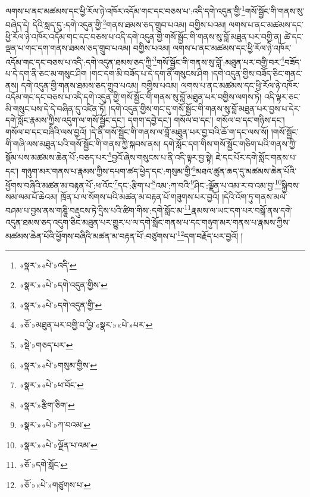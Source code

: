 ལགས་པ་ནང་མཚམས་དང་ཕྱི་རོལ་ཉེ་འཁོར་འདོམ་གང་དང་བཅས་པ་:འདི་དགེ་འདུན་གྱི་\footnote{«སྣར་»«པེ་»འདི་}གསོ་སྦྱོང་གི་གནས་སུ་བཞེད་དེ། དེའི་སླད་དུ་:དགེ་འདུན་གྱི་\footnote{«སྣར་»«པེ་»དགེ་འདུན་གྱིས་}གནས་ཐམས་ཅད་གྲུབ་པའམ། བགྱིས་པའམ། ལགས་པ་ནང་མཚམས་དང་ཕྱི་རོལ་ཉེ་འཁོར་འདོམ་གང་དང་བཅས་པ་འདི་དགེ་འདུན་གྱི་གསོ་སྦྱོང་གི་གནས་སུ་བློ་མཐུན་པར་བགྱི་ན། ཚེ་དང་ལྡན་པ་གང་དག་གནས་ཐམས་ཅད་གྲུབ་པའམ། བགྱིས་པའམ། ལགས་པ་ནང་མཚམས་དང་ཕྱི་རོལ་ཉེ་འཁོར་འདོམ་གང་དང་བཅས་པ་འདི་:དགེ་འདུན་ཐམས་ཅད་ཀྱི་\footnote{«སྣར་»«པེ་»དགེ་འདུན་གྱི་}གསོ་སྦྱོང་གི་གནས་སུ་བློ་:མཐུན་པར་བགྱི་བར་\footnote{«ཅོ་»མཐུན་པར་བགྱི་བ་ྱི་བ་«སྣར་»«པེ་»པར་}བཟོད་པ་དེ་དག་ནི་ཅང་མ་གསུང་ཤིག །གང་དག་མི་བཟོད་པ་དེ་དག་ནི་གསུངས་ཤིག །དགེ་འདུན་གྱིས་བཟོད་ཅིང་གནང་ནས། དགེ་འདུན་གྱི་གནས་ཐམས་ཅད་གྲུབ་པའམ། བགྱིས་པའམ། ལགས་པ་ནང་མཚམས་དང་ཕྱི་རོལ་ཉེ་འཁོར་འདོམ་གང་དང་བཅས་པ་འདི་དགེ་འདུན་གྱི་གསོ་སྦྱོང་གི་གནས་སུ་བློ་མཐུན་པར་བགྱིས་ལགས་ཏེ། འདི་ལྟར་ཅང་མི་གསུང་པས་དེ་དེ་བཞིན་དུ་འཛིན་ཏོ། །དགེ་འདུན་གྱིས་གང་དུ་གསོ་སྦྱོང་གི་གནས་སུ་བློ་མཐུན་པར་བྱས་པ་དེར་དགེ་སློང་རྣམས་ཀྱིས་འདུག་ལ་གསོ་སྦྱོང་དང་། དགག་དབྱེ་དང་། གསོལ་བ་དང་། གསོལ་བ་དང་གཉིས་དང་། གསོལ་བ་དང་བཞིའི་ལས་བྱའོ། །དེ་ནི་གསོ་སྦྱོང་གི་གནས་ལ་བློ་མཐུན་པར་བྱ་བའི་ཆོ་ག་དང་ལས་སོ། །གསོ་སྦྱོང་གི་གཞི་ལས་མཐུན་པའི་གསོ་སྦྱོང་གི་གནས་ཀྱི་སྐབས་ནས། དགེ་སློང་དག་གིས་གསོ་སྦྱོང་གཅིག་པའི་གནས་ཀྱི་སྡོམ་པས་མཚམས་ཆེན་པོ་:བཅད་པར་\footnote{«སྡེ་»གཅད་པར་}བྱའོ་ཞེས་གསུངས་པ་ནི་འདི་ལྟར་བྱ་སྟེ། ཇེ་དང་པོར་དགེ་སློང་གནས་པ་དང་། གཉུག་མར་གནས་པ་རྣམས་ཀྱིས་དཔག་ཚད་ཕྱེད་དང་:གསུམ་གྱི་\footnote{«སྣར་»«པེ་»གསུམ་གྱིས་}མཐའ་ཚུན་ཆད་དུ་མཚམས་ཆེན་པོའི་ཕྱོགས་བཞིའི་མཚན་མ་བརྟན་པོ་:ཕ་འོང་\footnote{«སྣར་»«པེ་»ཕ་བོང་}དང་:རྩིག་པ་\footnote{«སྣར་»རྩིག་ཅིག་}འམ་:ཀ་བའི་\footnote{«སྣར་»«པེ་»ཀ་བའམ་}ཤིང་:ལྗོན་པ་འམ་ར་བ་འམ་བྱ་\footnote{«སྣར་»«པེ་»ལྗོན་པ་འམ་}སྐྱིབས་སམ་ལམ་པོ་ཆེའམ། ཁྲོན་པ་ལ་སོགས་པའི་མཚན་མ་བརྟན་པོ་གཟུགས་པར་བྱའོ། །དེའི་འོག་ཏུ་གནས་མལ་བཤམ་པ་བྱས་ནས་གཎྜཱི་བརྡུངས་ཏེ་དྲིས་པའི་ཚིག་གིས་:དགེ་སློང་མ་\footnote{«ཅོ་»དགེ་སློང་}རྣམས་ལ་ཡང་དག་པར་བསྒོ་ནས་དགེ་འདུན་ཐམས་ཅད་འདུག་ཅིང་མཐུན་པར་གྱུར་པ་ལ་དགེ་སློང་གནས་པ་དང་གཉུག་མར་གནས་པ་རྣམས་ཀྱིས་མཚམས་ཆེན་པོའི་ཕྱོགས་བཞིའི་མཚན་མ་བརྟན་པོ་:བཙུགས་པ་\footnote{«ཅོ་»«པེ་»གཙུགས་པ་}དག་བརྗོད་པར་བྱའོ། །
